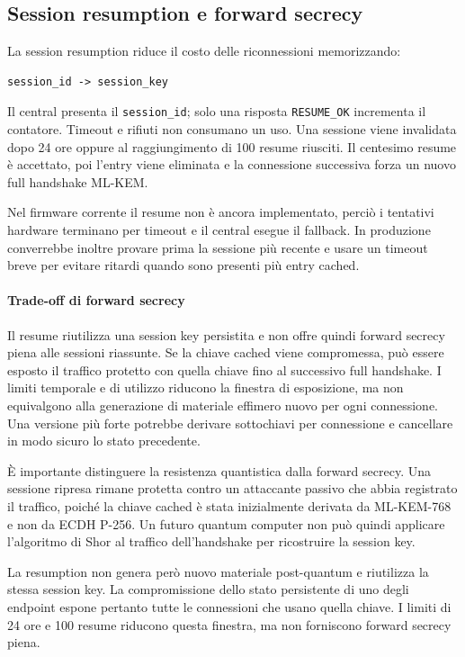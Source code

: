 \documentclass[11pt,a4paper]{article}
\begin{document}
\subsection{Session resumption e forward secrecy}\label{session-resumption}

La session resumption riduce il costo delle riconnessioni memorizzando:

\begin{lstlisting}
session_id -> session_key
\end{lstlisting}

Il central presenta il \texttt{session\_id}; solo una risposta
\texttt{RESUME\_OK} incrementa il contatore. Timeout e rifiuti non
consumano un uso. Una sessione viene invalidata dopo 24 ore oppure al
raggiungimento di 100 resume riusciti. Il centesimo resume è accettato,
poi l'entry viene eliminata e la connessione successiva forza un nuovo
full handshake ML-KEM.

Nel firmware corrente il resume non è ancora implementato, perciò i
tentativi hardware terminano per timeout e il central esegue il fallback.
In produzione converrebbe inoltre provare prima la sessione più recente e
usare un timeout breve per evitare ritardi quando sono presenti più entry
cached.

\paragraph{Trade-off di forward secrecy}
Il resume riutilizza una session key persistita e non offre quindi forward
secrecy piena alle sessioni riassunte. Se la chiave cached viene
compromessa, può essere esposto il traffico protetto con quella chiave
fino al successivo full handshake. I limiti temporale e di utilizzo
riducono la finestra di esposizione, ma non equivalgono alla generazione
di materiale effimero nuovo per ogni connessione. Una versione più forte
potrebbe derivare sottochiavi per connessione e cancellare in modo sicuro
lo stato precedente.

È importante distinguere la resistenza quantistica dalla forward secrecy.
Una sessione ripresa rimane protetta contro un attaccante passivo che
abbia registrato il traffico, poiché la chiave cached è stata inizialmente
derivata da ML-KEM-768 e non da ECDH P-256. Un futuro quantum computer
non può quindi applicare l'algoritmo di Shor al traffico dell'handshake
per ricostruire la session key.

La resumption non genera però nuovo materiale post-quantum e riutilizza
la stessa session key. La compromissione dello stato persistente di uno
degli endpoint espone pertanto tutte le connessioni che usano quella
chiave. I limiti di 24 ore e 100 resume riducono questa finestra, ma non
forniscono forward secrecy piena.
\end{document}

